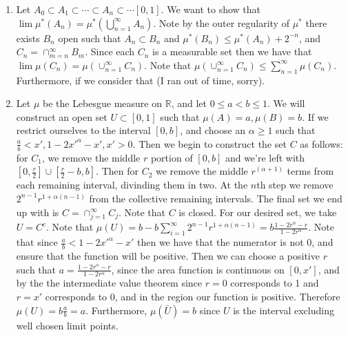 \documentclass[12pt, letterpaper]{article}
\newcommand{\R}{\mathbb{R}}
\begin{document}
\begin{enumerate}
	Therefore 
	we have that 
	\begin{align*}
	\mu^*(C) &< \mu^*(C \cap E) + \mu^*(C \cap E^c)\\
	&= \mu^*(C \cap E \cap A) +\mu^*(C \cap E \cap A^c) + \mu^*(C \cap E^c \cap A)
	+\mu^*(C \cap E^c \cap A^c)\\
	&= \mu^*(C \cap (E \cup A)) + \mu^*(C \cap E^c \cap A^c)\\
	&= \mu^*c(C).
	\end{align*}
	Note that this is a contradiction.  
	\item[9] Let $A_0 \subset A_1 \subset \cdots \subset A_n \subset \cdots [0,1]$.
	We want to show that $\lim \mu^*(A_n) = \mu^*(\bigcup_{n=1}^\infty A_n)$.
	Note by the outer regularity of $\mu^*$ there exists $B_n$ open such that 
	$A_n \subset B_n$ and $\mu^*(B_n) \leq \mu^*(A_n) + 2^{-n}$, and 
	$C_n = \cap_{m=n}^\infty B_m$.  Since each $C_n$ is a measurable set then we 
	have that $\lim \mu(C_n) = \mu(\cup_{n=1}^\infty C_n)$.
	Note that $\mu(\cup_{n=1}^\infty C_n) \leq \sum_{n=1}^\infty \mu(C_n)$.
	Furthermore, if we consider that (I ran out of time, sorry).
	\item[10] Let $\mu$ be the Lebesgue measure on $\R$, and let $0 \leq a < b \leq 1$.
	We will construct an open set $U \subset [0,1]$ such that $\mu(A) = a, \mu(B) = b$.
	If we restrict ourselves to the interval $[0,b]$, and choose an $\alpha \geq 1$ 
	such that $\frac{a}{b} < x', 1 - 2x'^\alpha - x', x' >0$.  Then we begin to 
	construct the set $C$ as follows: for $C_1$, we remove the middle $r$ portion of 
	$[0,b]$ and we're left with $[0, \frac{r}{2}] \cup [\frac{r}{2} - b, b]$.  Then for 
	$C_2$ we remove the middle $r^(\alpha + 1)$ terms from each remaining interval, 
	divinding them in two.  At the $n$th step we remove $2^{n-1}r^{1+\alpha(n-1)}$ from 
	the collective remaining intervals.  The final set we end up with is
	$C = \cap_{j=1}^\infty C_j$.  Note that $C$ is closed.  For our desired set, we take
	$U = C^c$.  Note that $\mu(U) = b - b\sum_{i=1}^\infty 2^{n-1} r^{1 + \alpha(n-1)}
	= b\frac{1 - 2r^\alpha - r}{1 - 2r^\alpha}$.  Note that since $\frac{a}{b} < 1 - 2x'^\alpha - x'$ then we have that the numerator is not 0, and ensure that the function
	will be positive.  Then we can choose a positive $r$ such that $a = \frac{1 - 2r^\alpha - r}{1 - 2r^\alpha}$, since the area function is continuous on $[0,x']$, and
	by the the intermediate value theorem since $r = 0$ corresponds to 1 and $r=x'$ 
	corresponds to 0, and in the region our function is positive.  Therefore 
	$\mu(U) = b \frac{a}{b} = a$.  Furthermore, $\mu(\bar{U}) = b$ since $U$ is the 
	interval excluding well chosen limit points.  
\end{enumerate}
\end{document}
